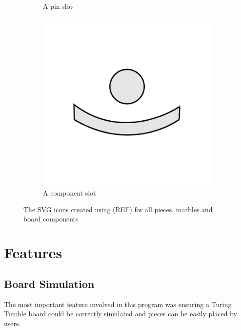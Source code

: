 \documentclass{l4proj}
\begin{document}
\begin{figure}
\begin{subfigure}[b]{0.3\textwidth}
        \caption{A pin slot}
        \label{fig:pin}
    \end{subfigure}
    \begin{subfigure}[b]{0.3\textwidth}
        \includegraphics[width=1\textwidth]{images/compslot.png}
        \caption{A component slot}
        \label{fig:compslot}
    \end{subfigure}
    \caption{The SVG icons created using (REF) for all pieces, marbles and board components}
    \label{fig:pieces}
\end{figure}

\section{Features}

\subsection{Board Simulation}
The most important feature involved in this program was ensuring a Turing Tumble board could be correctly simulated and pieces can be easily placed by users. 
\end{document}
